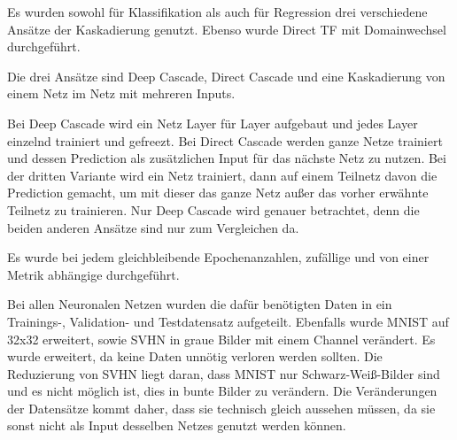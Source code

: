 Es wurden sowohl für Klassifikation als auch für Regression drei verschiedene Ansätze der Kaskadierung genutzt. 
Ebenso wurde Direct TF mit Domainwechsel durchgeführt. 

Die drei Ansätze sind Deep Cascade, Direct Cascade und eine Kaskadierung von einem Netz im Netz mit mehreren Inputs.

Bei Deep Cascade wird ein Netz Layer für Layer aufgebaut und jedes Layer einzelnd trainiert und gefreezt. 
Bei Direct Cascade werden ganze Netze trainiert und dessen Prediction als zusätzlichen Input für das nächste Netz zu nutzen.
Bei der dritten Variante wird ein Netz trainiert, dann auf einem Teilnetz davon die Prediction gemacht, um mit dieser das 
ganze Netz außer das vorher erwähnte Teilnetz zu trainieren. 
Nur Deep Cascade wird genauer betrachtet, denn die beiden anderen Ansätze sind nur zum Vergleichen da.

Es wurde bei jedem gleichbleibende Epochenanzahlen, zufällige und von einer Metrik abhängige durchgeführt. 

Bei allen Neuronalen Netzen wurden die dafür benötigten Daten in ein Trainings-, Validation- und Testdatensatz aufgeteilt. 
Ebenfalls wurde MNIST auf 32x32 erweitert, sowie SVHN in graue Bilder mit einem Channel verändert. 
Es wurde erweitert, da keine Daten unnötig verloren werden sollten. Die Reduzierung von SVHN liegt daran, dass MNIST nur 
Schwarz-Weiß-Bilder sind und es nicht möglich ist, dies in bunte Bilder zu verändern.
Die Veränderungen der Datensätze kommt daher, dass sie technisch gleich aussehen müssen, da sie sonst nicht als Input 
desselben Netzes genutzt werden können.

